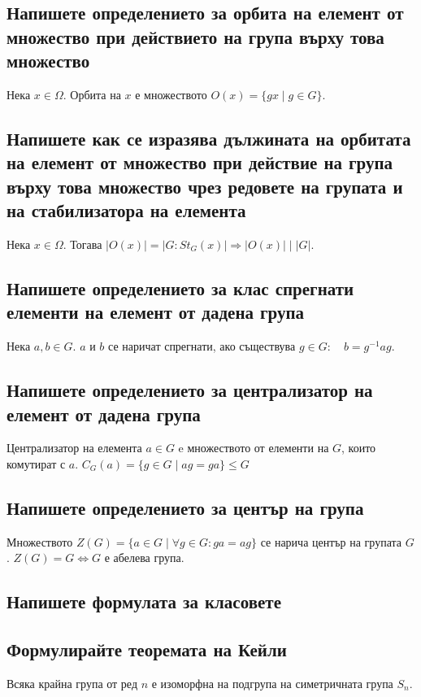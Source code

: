 \documentclass[12pt]{article}
\begin{document}
\subsection*{Напишете определението за орбита на елемент от множество при действието на група върху това множество}
Нека $x \in \Omega$. Орбита на $x$ е множеството $O(x) = \{gx \mid g \in G\}$.

\subsection*{Напишете как се изразява дължината на орбитата на елемент от множество при действие на група върху това множество чрез редовете на групата и на стабилизатора на елемента}
Нека $x \in \Omega$. Тогава $|O(x)| = |G:St_G(x)| \Rightarrow |O(x)| \mid |G|$.

\subsection*{Напишете определението за клас спрегнати елементи на елемент от дадена група}
Нека $a, b \in G$. $a$ и $b$ се наричат спрегнати, ако съществува $g \in G: \quad b = g^{-1}ag$.

\subsection*{Напишете определението за централизатор на елемент от дадена група}
Централизатор на елемента $a \in G$ e множеството от елементи на $G$, които комутират с $a$. $C_G(a) = \{g \in G \mid ag = ga\} \leq G$

\subsection*{Напишете определението за център на група}
Множеството $Z(G) = \{a \in G \mid \forall g \in G: ga = ag\}$ се нарича център на групата $G$. $Z(G) = G \Leftrightarrow G$ е абелева група.

\subsection*{Напишете формулата за класовете}


\subsection*{Формулирайте теоремата на Кейли}
Всяка крайна група от ред $n$ е изоморфна на подгрупа на симетричната група $S_n$.
\end{document}
